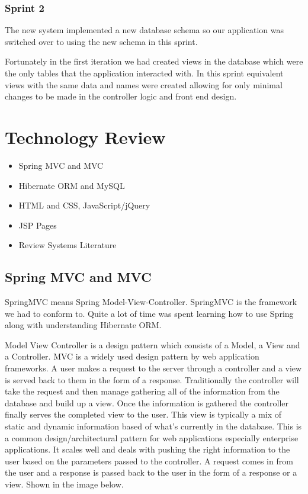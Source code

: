 \subsection{Sprint 2}
The new system implemented a new database schema so our application was switched over to using the new schema in this sprint. 

Fortunately in the first iteration we had created views in the database which were the only tables that the application interacted with. In this sprint equivalent views with the same data and names were created allowing for only minimal changes to be made in the controller logic and front end design.
 
\chapter{Technology Review}

\begin{itemize}	
	\item Spring MVC and MVC	
	\item Hibernate ORM and MySQL
	\item HTML and CSS, JavaScript/jQuery
	\item JSP Pages
	\item Review Systems Literature
\end{itemize}

\section{Spring MVC and MVC}

SpringMVC\cite{SpringMVC} means Spring Model-View-Controller. SpringMVC is the framework we had to conform to. Quite a lot of time was spent learning how to use Spring along with understanding Hibernate ORM.

Model View Controller is a design pattern which consists of a Model, a View and a Controller. MVC is a widely used design pattern by web application frameworks. A user makes a request to the server through a controller and a view is served back to them in the form of a response. Traditionally the controller will take the request and then manage gathering all of the information from the database and build up a view. Once the information is gathered the controller finally serves the completed view to the user. This view is typically a mix of static and dynamic information based of what's currently in the database. This is a common design/architectural pattern for web applications especially enterprise applications. It scales well and deals with pushing the right information to the user based on the parameters passed to the controller. A request comes in from the user and a response is passed back to the user in the form of a response or a view. Shown in the image below.

